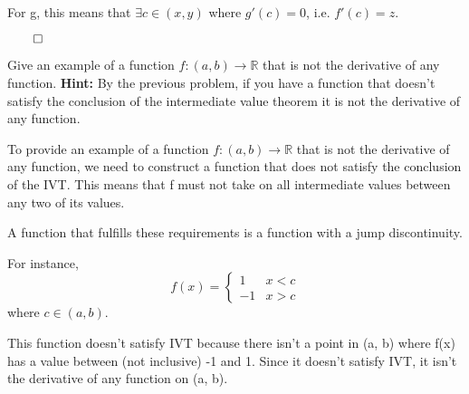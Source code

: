 \documentclass[answers]{exam}
\theoremstyle{remark}
\theoremstyle{definition}
\newcommand{\RR}{\mathbb{R}}
\begin{document}
\begin{questions}
\begin{solution}
For g, this means that $\exists c \in (x, y)$
where $g'(c) = 0$, i.e. $f'(c) = z$.

$\qed$

\end{solution}

\question[4] Give an example of a function $f:(a,b) \to \RR$ that is not the derivative of any function. \textbf{Hint:} By the previous problem, if you have a function that doesn't satisfy the conclusion of the intermediate value theorem it is not the derivative of any function.
\begin{solution}

To provide an example of a function $f:(a, b) \to \RR$ that is not
the derivative of any function, we need to construct a function
that does not satisfy the conclusion of the IVT. This means that
f must not take on all intermediate values between any two of its values.

A function that fulfills these requirements is a function
with a jump discontinuity.

For instance,
\[f(x) = \begin{cases}
    1 & x < c \\
    -1 & x > c
\end{cases}\]
where $c \in (a, b)$.

This function doesn't satisfy IVT because there isn't a point in (a, b)
where f(x) has a value between (not inclusive) -1 and 1.
Since it doesn't satisfy IVT, it isn't the derivative of any function
on (a, b).

\end{solution}
\end{questions}
\end{document}
